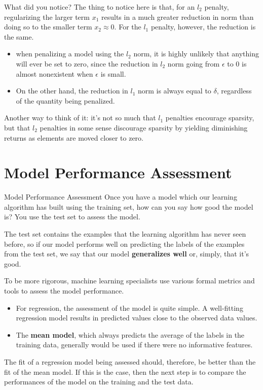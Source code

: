 \documentclass[8pt,dvipsnames]{beamer}
\begin{document}
\begin{frame}{What did you notice?}
	The thing to notice here is that, for an \(l_{2}\) penalty, regularizing the larger term \(x_{1}\) results in a much greater reduction in norm than doing so to the smaller term \(x_{2} \approx 0\). For the \(l_{1}\) penalty, however, the reduction is the same.
	\begin{itemize}
		\item when penalizing a model using the \(l_{2}\) norm, it is highly unlikely that anything will ever be set to zero, since the reduction in \(l_{2}\) norm going from \(\epsilon\) to \(0\) is almost nonexistent when \(\epsilon\) is small.
		\item On the other hand, the reduction in \(l_{1}\) norm is always equal to \(\delta\), regardless of the quantity being penalized.
	\end{itemize}
	Another way to think of it: it's not so much that \(l_{1}\) penalties encourage sparsity, but that \(l_{2}\) penalties in some sense discourage sparsity by yielding diminishing returns as elements are moved closer to zero.
\end{frame}

\section{Model Performance Assessment}
\begin{frame}{Model Performance Assessment}
	Once you have a model which our learning algorithm has built using the training set, how can you say how good the model is? You use the test set to assess the model.

	The test set contains the examples that the learning algorithm has never seen before, so if our model performs well on predicting the labels of the examples from the test set, we say that our model \textbf{generalizes well} or, simply, that it's good.
\end{frame}

\begin{frame}
	To be more rigorous, machine learning specialists use various formal metrics and tools to assess the model performance.
	\begin{itemize}
		\item For regression, the assessment of the model is quite simple. A well-fitting regression model results in predicted values close to the observed data values.
		\item The \textbf{mean model}, which always predicts the average of the labels in the training data, generally would be used if there were no informative features.
	\end{itemize}
	The fit of a regression model being assessed should, therefore, be better than the fit of the mean model. If this is the case, then the next step is to compare the performances of the model on the training and the test data.
\end{frame}
\end{document}
